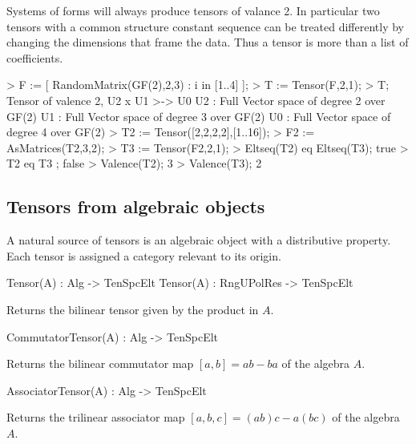 \begin{example}
Systems of forms will always produce tensors of valance 2.  In particular
two tensors with a common structure constant sequence can be treated differently by
changing the dimensions that frame the data.  Thus a tensor is more than a list of coefficients.

\begin{code}
> F := [ RandomMatrix(GF(2),2,3) : i in [1..4] ];
> T := Tensor(F,2,1);
> T;
Tensor of valence 2, U2 x U1 >-> U0
U2 : Full Vector space of degree 2 over GF(2)
U1 : Full Vector space of degree 3 over GF(2)
U0 : Full Vector space of degree 4 over GF(2)
> T2 := Tensor([2,2,2,2],[1..16]);
> F2 := AsMatrices(T2,3,2);
> T3 := Tensor(F2,2,1);
> Eltseq(T2) eq Eltseq(T3);
true
> T2 eq T3 ;
false
> Valence(T2);
3
> Valence(T3);
2
\end{code}
\end{example}

\subsection{Tensors from algebraic objects}
A natural source of tensors is an algebraic object with a distributive 
property.
Each tensor is assigned a category relevant to its origin. 


\begin{intrinsics}
Tensor(A) : Alg -> TenSpcElt
Tensor(A) : RngUPolRes -> TenSpcElt
\end{intrinsics}

Returns the bilinear tensor given by the product in $A$.

\begin{intrinsics}
CommutatorTensor(A) : Alg -> TenSpcElt
\end{intrinsics}

Returns the bilinear commutator map $[a,b]=ab-ba$ of the algebra $A$.

\begin{intrinsics}
AssociatorTensor(A) : Alg -> TenSpcElt
\end{intrinsics}

Returns the trilinear associator map $[a,b,c]=(ab)c-a(bc)$ of the algebra $A$.

